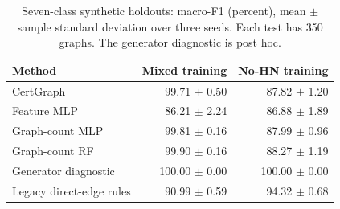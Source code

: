 \begin{table}[t]
\centering
\caption{Seven-class synthetic holdouts: macro-F1 (percent), mean $\pm$ sample standard deviation over three seeds. Each test has 350 graphs. The generator diagnostic is post hoc.}
\label{tab:legacy}
\footnotesize
\begin{tabular}{lrr}
\toprule
Method & Mixed training & No-HN training \\
\midrule
CertGraph & 99.71 $\pm$ 0.50 & 87.82 $\pm$ 1.20 \\
Feature MLP & 86.21 $\pm$ 2.24 & 86.88 $\pm$ 1.89 \\
Graph-count MLP & 99.81 $\pm$ 0.16 & 87.99 $\pm$ 0.96 \\
Graph-count RF & 99.90 $\pm$ 0.16 & 88.27 $\pm$ 1.19 \\
Generator diagnostic & 100.00 $\pm$ 0.00 & 100.00 $\pm$ 0.00 \\
Legacy direct-edge rules & 90.99 $\pm$ 0.59 & 94.32 $\pm$ 0.68 \\
\bottomrule
\end{tabular}
\end{table}
